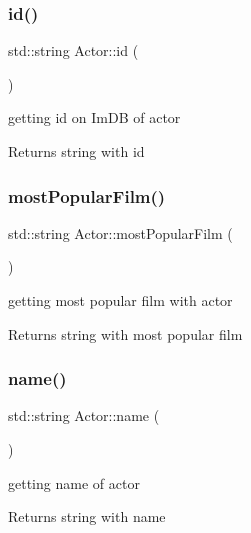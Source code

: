 \subsubsection{\texorpdfstring{id()}{id()}}
{\footnotesize\ttfamily std\+::string Actor\+::id (\begin{DoxyParamCaption}{ }\end{DoxyParamCaption})}



getting id on Im\+DB of actor 

\begin{DoxyReturn}{Returns}
string with id 
\end{DoxyReturn}
\mbox{\label{classActor_a26e7eb5386554b5f35e91e55aca633c3}} 
\subsubsection{\texorpdfstring{most\+Popular\+Film()}{mostPopularFilm()}}
{\footnotesize\ttfamily std\+::string Actor\+::most\+Popular\+Film (\begin{DoxyParamCaption}{ }\end{DoxyParamCaption})}



getting most popular film with actor 

\begin{DoxyReturn}{Returns}
string with most popular film 
\end{DoxyReturn}
\mbox{\label{classActor_a9c6aa7e7cd5e8183ea66aa97eb6b015c}} 
\subsubsection{\texorpdfstring{name()}{name()}}
{\footnotesize\ttfamily std\+::string Actor\+::name (\begin{DoxyParamCaption}{ }\end{DoxyParamCaption})}



getting name of actor 

\begin{DoxyReturn}{Returns}
string with name 
\end{DoxyReturn}
\mbox{\label{classActor_a0cf1e28725cadacefb040914667cd5cc}} 
